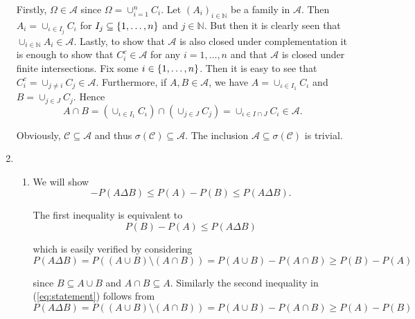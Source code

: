\begin{enumerate}[label = \textbf{Exercise \arabic*.},wide = 0pt, itemsep=1.5ex]
	Firstly, $\Omega \in \mathcal{A}$ since $\Omega = \cup_{i = 1}^n C_i$. Let $(A_i)_{i \in \mathbb{N}}$ be a family in $\mathcal{A}$. Then $A_i = \cup_{\iota \in I_j} C_\iota$ for $I_j \subseteq \cbr[0]{1,\dots,n}$ and $j \in \mathbb{N}$. But then it is clearly seen that $\cup_{i \in \mathbb{N}} A_i \in \mathcal{A}$. Lastly, to show that $\mathcal{A}$ is also closed under complementation it is enough to show that $C_i^c \in \mathcal{A}$ for any $i = 1,\dots,n$ and that $\mathcal{A}$ is closed under finite intersections. Fix some $i \in \cbr[0]{1,\dots,n}$. Then it is easy to see that $C_i^c = \cup_{j \neq i}C_j \in \mathcal{A}$. Furthermore, if $A,B \in \mathcal{A}$, we have $A = \cup_{\iota \in I_1} C_\iota$ and $B = \cup_{j \in J} C_j$. Hence 
	\begin{equation*}
		A \cap B = (\cup_{\iota \in I_1} C_\iota) \cap (\cup_{j \in J} C_j) = \cup_{\iota \in I \cap J}C_\iota \in \mathcal{A}.
	\end{equation*}

	Obviously, $\mathcal{C} \subseteq \mathcal{A}$ and thus $\sigma(\mathcal{C}) \subseteq \mathcal{A}$. The inclusion $\mathcal{A} \subseteq \sigma(\mathcal{C})$ is trivial.
\item 
	~
	\begin{enumerate}[label = \arabic*.,wide = 0pt, itemsep=1.5ex]
		\item We will show 
			\begin{equation}
				-P(A \Delta B) \leq P(A) - P(B) \leq P(A \Delta B).
				\label{eq:statement}
			\end{equation}

			The first inequality is equivalent to
			\begin{equation*}
				P(B) - P(A) \leq P(A \Delta B)
			\end{equation*}

			\noindent which is easily verified by considering
			\begin{equation*}
				P(A \Delta B) = P((A \cup B) \setminus (A\cap B)) = P(A \cup B) - P(A \cap B) \geq P(B) - P(A)
			\end{equation*}

			\noindent since $B \subseteq A \cup B$ and $A \cap B \subseteq A$. Similarly the second inequality in (\ref{eq:statement}) follows from
			\begin{equation*}
				P(A \Delta B) = P((A \cup B) \setminus (A\cap B)) = P(A \cup B) - P(A \cap B) \geq P(A) - P(B)
			\end{equation*}


\end{enumerate}
\end{enumerate}
